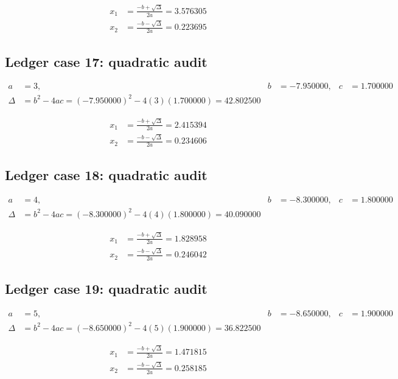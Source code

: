 \documentclass[11pt,a4paper]{article}
\begin{document}
\begin{align}
x_1 &= \frac{-b+\sqrt{\Delta}}{2a} = 3.576305 \\
x_2 &= \frac{-b-\sqrt{\Delta}}{2a} = 0.223695
\end{align}

\subsection{Ledger case 17: quadratic audit}
\begin{align}
a &= 3, & b &= -7.950000, & c &= 1.700000 \\
\Delta &= b^2-4ac = (-7.950000)^2 - 4(3)(1.700000) = 42.802500
\end{align}

\begin{align}
x_1 &= \frac{-b+\sqrt{\Delta}}{2a} = 2.415394 \\
x_2 &= \frac{-b-\sqrt{\Delta}}{2a} = 0.234606
\end{align}

\subsection{Ledger case 18: quadratic audit}
\begin{align}
a &= 4, & b &= -8.300000, & c &= 1.800000 \\
\Delta &= b^2-4ac = (-8.300000)^2 - 4(4)(1.800000) = 40.090000
\end{align}

\begin{align}
x_1 &= \frac{-b+\sqrt{\Delta}}{2a} = 1.828958 \\
x_2 &= \frac{-b-\sqrt{\Delta}}{2a} = 0.246042
\end{align}

\newpage

\subsection{Ledger case 19: quadratic audit}
\begin{align}
a &= 5, & b &= -8.650000, & c &= 1.900000 \\
\Delta &= b^2-4ac = (-8.650000)^2 - 4(5)(1.900000) = 36.822500
\end{align}

\begin{align}
x_1 &= \frac{-b+\sqrt{\Delta}}{2a} = 1.471815 \\
x_2 &= \frac{-b-\sqrt{\Delta}}{2a} = 0.258185
\end{align}
\end{document}
